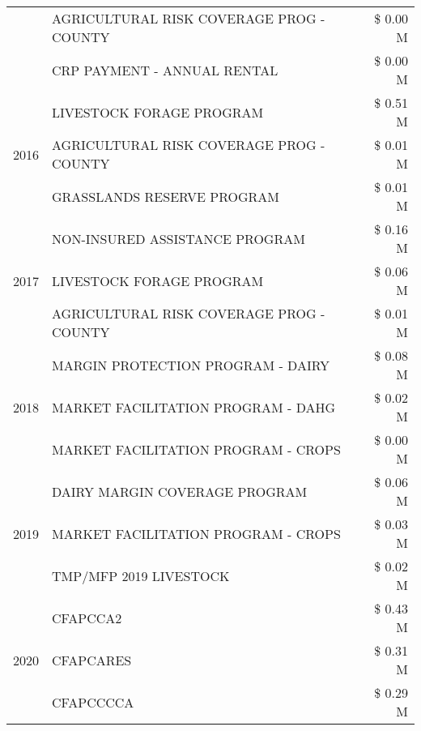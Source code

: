 \begin{tabular}{llr}
 & AGRICULTURAL RISK COVERAGE PROG - COUNTY & \$ 0.00 M \\
 & CRP PAYMENT - ANNUAL RENTAL & \$ 0.00 M \\
\cline{1-3}
\multirow[t]{3}{*}{2016} & LIVESTOCK FORAGE PROGRAM                      & \$ 0.51 M \\
 & AGRICULTURAL RISK COVERAGE PROG - COUNTY      & \$ 0.01 M \\
 & GRASSLANDS RESERVE PROGRAM                    & \$ 0.01 M \\
\cline{1-3}
\multirow[t]{3}{*}{2017} & NON-INSURED ASSISTANCE PROGRAM & \$ 0.16 M \\
 & LIVESTOCK FORAGE PROGRAM & \$ 0.06 M \\
 & AGRICULTURAL RISK COVERAGE PROG - COUNTY & \$ 0.01 M \\
\cline{1-3}
\multirow[t]{3}{*}{2018} & MARGIN PROTECTION PROGRAM - DAIRY & \$ 0.08 M \\
 & MARKET FACILITATION PROGRAM - DAHG & \$ 0.02 M \\
 & MARKET FACILITATION PROGRAM - CROPS & \$ 0.00 M \\
\cline{1-3}
\multirow[t]{3}{*}{2019} & DAIRY MARGIN COVERAGE PROGRAM & \$ 0.06 M \\
 & MARKET FACILITATION PROGRAM - CROPS & \$ 0.03 M \\
 & TMP/MFP 2019 LIVESTOCK & \$ 0.02 M \\
\cline{1-3}
\multirow[t]{3}{*}{2020} & CFAPCCA2 & \$ 0.43 M \\
 & CFAPCARES & \$ 0.31 M \\
 & CFAPCCCCA & \$ 0.29 M \\
\cline{1-3}
\bottomrule
\end{tabular}
